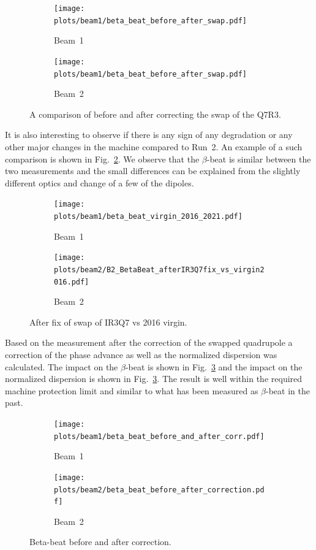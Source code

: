 \documentclass{cernatsnote}
\begin{document}
\begin{figure}[ht]
\begin{subfigure}{.5\textwidth}
  \centering
  \texttt{[image: plots/beam1/beta\_beat\_before\_after\_swap.pdf]}  
  \caption{Beam~1}
\end{subfigure}
\begin{subfigure}{.5\textwidth}
  \centering
  \texttt{[image: plots/beam1/beta\_beat\_before\_after\_swap.pdf]}  
  \caption{Beam~2}
\end{subfigure}
\caption{A comparison of before and after correcting the swap of the Q7R3.}
\label{fig:before_after_swap}
\end{figure}

It is also interesting to observe if there is any sign of any degradation or any other major changes in the machine compared to Run~2. An example of a such comparison is shown in Fig.~\ref{fig:after_swap_vs_2016}. We observe that the $\beta$-beat is similar between the two measurements and the small differences can be explained from the slightly different optics and change of a few of the dipoles. 

\begin{figure}[ht]
\begin{subfigure}{.5\textwidth}
  \centering
  \texttt{[image: plots/beam1/beta\_beat\_virgin\_2016\_2021.pdf]}  
  \caption{Beam~1}
\end{subfigure}
\begin{subfigure}{.5\textwidth}
  \centering
  \texttt{[image: plots/beam2/B2\_BetaBeat\_afterIR3Q7fix\_vs\_virgin2016.pdf]}  
  \caption{Beam~2}
\end{subfigure}
\caption{After fix of swap of IR3Q7 vs 2016 virgin.}
\label{fig:after_swap_vs_2016}
\end{figure}

Based on the measurement after the correction of the swapped quadrupole a correction of the phase advance as well as the normalized dispersion was calculated. The impact on the $\beta$-beat is shown in Fig.~\ref{fig:before_after_correction_beta_beat} and the impact on the normalized dispersion is shown in Fig.~\ref{fig:before_after_correction_beta_beat}. The result is well within the required machine protection limit and similar to what has been measured as $\beta$-beat in the past. 


\begin{figure}[ht]
\begin{subfigure}{.5\textwidth}
  \centering
  \texttt{[image: plots/beam1/beta\_beat\_before\_and\_after\_corr.pdf]}  
  \caption{Beam~1}
\end{subfigure}
\begin{subfigure}{.5\textwidth}
  \centering
  \texttt{[image: plots/beam2/beta\_beat\_before\_after\_correction.pdf]}  
  \caption{Beam~2}
\end{subfigure}
\caption{Beta-beat before and after correction.}
\label{fig:before_after_correction_beta_beat}
\end{figure}
\end{document}
